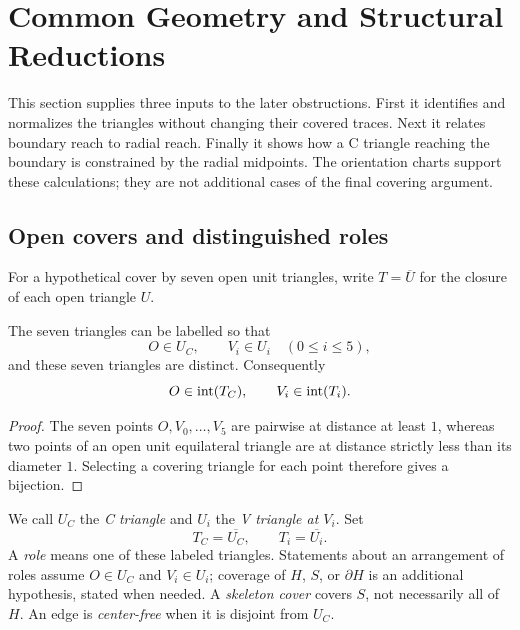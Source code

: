 \section{Common Geometry and Structural Reductions}
\label{sec:structure-common}
\label{sec:structural-reductions}
\label{app:structural-shared-local-signed-center}

This section supplies three inputs to the later obstructions. First it
identifies and normalizes the triangles without changing their covered
traces. Next it relates boundary reach to radial reach. Finally it shows
how a C triangle reaching the boundary is constrained by the radial
midpoints. The orientation charts support these calculations; they are
not additional cases of the final covering argument.

\subsection{Open covers and distinguished roles}
For a hypothetical cover by seven open unit triangles, write $T=\overline U$
for the closure of each open triangle $U$.

\begin{lemma}
\label{lem:distinct-roles}
The seven triangles can be labelled so that
\[
 O\in U_C,\qquad V_i\in U_i\quad(0\le i\le5),
\]
and these seven triangles are distinct.  Consequently
\[
 O\in\mathrm{int}(T_C),\qquad V_i\in\mathrm{int}(T_i).
\]
\end{lemma}

\begin{proof}
The seven points $O,V_0,\ldots,V_5$ are pairwise at distance at least $1$,
whereas two points of an open unit equilateral triangle are at distance
strictly less than its diameter $1$.  Selecting a covering triangle for each
point therefore gives a bijection.
\end{proof}

We call $U_C$ the \emph{C triangle} and $U_i$ the \emph{V triangle at
$V_i$}.  Set
\[
 T_C=\overline{U_C},\qquad T_i=\overline{U_i}.
\]
A \emph{role} means one of these labeled triangles. Statements about an
arrangement of roles assume $O\in U_C$ and $V_i\in U_i$; coverage of
$H$, $S$, or $\partial H$ is an additional hypothesis, stated when needed.
A \emph{skeleton cover} covers $S$, not necessarily all of $H$.
An edge is \emph{center-free} when it is disjoint from $U_C$.






